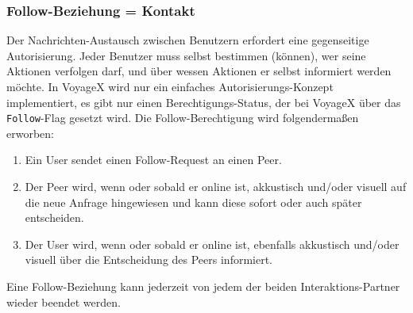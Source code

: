 \subsubsection{Follow-Beziehung = Kontakt}
Der Nachrichten-Austausch zwischen Benutzern erfordert eine gegenseitige Autorisierung. Jeder Benutzer muss selbst bestimmen (können), wer seine Aktionen verfolgen darf, und über wessen Aktionen er selbst informiert werden möchte. In VoyageX wird nur ein einfaches Autorisierungs-Konzept implementiert, es gibt nur einen Berechtigungs-Status, der bei VoyageX über das \texttt{Follow}-Flag gesetzt wird.
Die Follow-Berechtigung wird folgendermaßen erworben:
\begin{enumerate}[leftmargin=*,noitemsep,topsep=1ex,parsep=0pt,partopsep=0pt]
\item Ein User sendet einen Follow-Request an einen Peer. 
\item Der Peer wird, wenn oder sobald er online ist, akkustisch und/oder visuell auf die neue Anfrage hingewiesen und kann diese
sofort oder auch später entscheiden.
\item Der User wird, wenn oder sobald er online ist, ebenfalls akkustisch und/oder visuell über die Entscheidung des Peers informiert. 
\end{enumerate}
Eine Follow-Beziehung kann jederzeit von jedem der beiden Interaktions-Partner wieder beendet werden.

